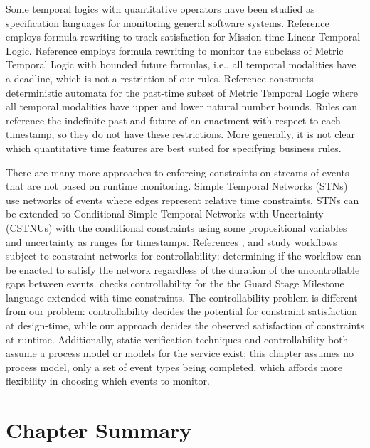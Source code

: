 Some temporal logics with quantitative operators 
have been studied as specification languages
for monitoring general software systems.
Reference \cite{li2018mltl} employs formula rewriting to track satisfaction
for Mission-time Linear Temporal Logic.
Reference \cite{basin2017almost} employs formula rewriting
to monitor the subclass of Metric Temporal Logic
with bounded future formulas, i.e., all temporal modalities have a deadline,
which is not a restriction of our rules.
Reference \cite{maler2005real} constructs deterministic automata
for the past-time subset of Metric Temporal Logic
where all temporal modalities have upper and lower natural number bounds.
Rules can reference the indefinite past and future of an enactment
with respect to each timestamp, so they do not have these restrictions.
More generally, it is not clear which quantitative time features
are best suited for specifying business rules.

There are many more approaches to enforcing constraints
on streams of events that are not based on runtime monitoring.
Simple Temporal Networks (STNs) \cite{dechter1991temporal} use
networks of events where edges represent
relative time constraints.
STNs can be extended to
Conditional Simple Temporal Networks with Uncertainty (CSTNUs)
with the conditional constraints
using some propositional variables and
uncertainty as ranges for timestamps.
References \cite{hunsberger2018sound,combi2019conditional,franceschetti2023dynamic}, and 
study workflows subject to constraint networks for controllability:
determining if the workflow can be enacted to satisfy the network
regardless of the duration of the uncontrollable gaps between events.
\cite{kopke2018gsm+} 
checks controllability
for the the Guard Stage Milestone language
extended with time constraints.
The controllability problem is different from our problem:
controllability decides the potential for constraint satisfaction at design-time,
while our approach decides the observed satisfaction of constraints at runtime.
Additionally,
static verification techniques and controllability
both assume a process model or models for the service exist;
this chapter assumes no process model,
only a set of event types being completed,
which affords more flexibility in choosing which events to monitor.

\section{Chapter Summary}
\label{sec:conclusion}


